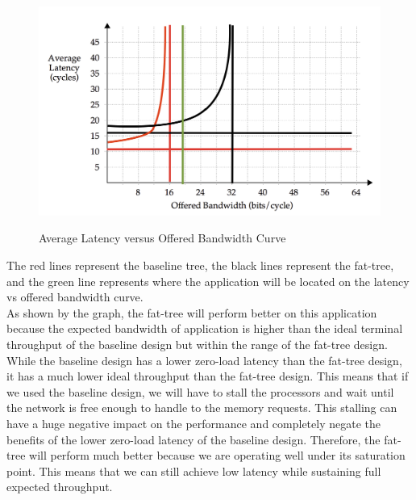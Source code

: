 \documentclass[10pt]{article}
\begin{document}
\begin{figure}[H]
\begin{center}
\includegraphics[scale=1]{graph.png}
\label{default}
\end{center}
\caption{Average Latency versus Offered Bandwidth Curve}
\end{figure}

The red lines represent the baseline tree, the black lines represent the fat-tree, and the green line represents where the application will be located on the latency vs offered bandwidth curve.\\

As shown by the graph, the fat-tree will perform better on this application because the expected bandwidth of application is higher than the ideal terminal throughput of the baseline design but within the range of the fat-tree design. While the baseline design has a lower zero-load latency than the fat-tree design, it has a much lower ideal throughput than the fat-tree design. This means that if we used the baseline design, we will have to stall the processors and wait until the network is free enough to handle to the memory requests. This stalling can have a huge negative impact on the performance and completely negate the benefits of the lower zero-load latency of the baseline design. Therefore, the fat-tree will perform much better because we are operating well under its saturation point. This means that we can still achieve low latency while sustaining full expected throughput. \\
\end{document}
